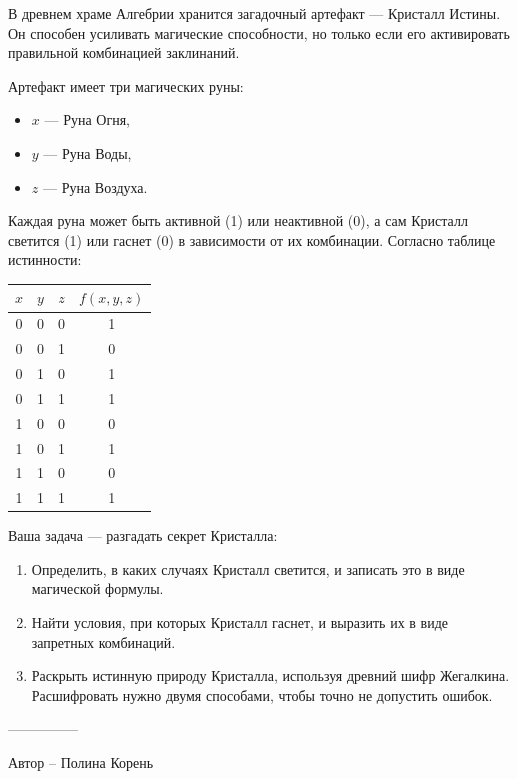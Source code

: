 \question
В древнем храме Алгебрии хранится загадочный артефакт — Кристалл Истины. Он способен усиливать магические способности, но только если его активировать правильной комбинацией заклинаний.

Артефакт имеет три магических руны:
\begin{itemize}
    \item \(x\) — Руна Огня,
    \item \(y\) — Руна Воды,
    \item \(z\) — Руна Воздуха.
\end{itemize}

Каждая руна может быть активной (1) или неактивной (0), а сам Кристалл светится (1) или гаснет (0) в зависимости от их комбинации. Согласно таблице истинности:

\begin{center}
\begin{tabular}{|c|c|c|c|}
\hline
\(x\) & \(y\) & \(z\) & \(f(x, y, z)\) \\
\hline
0 & 0 & 0 & 1 \\
0 & 0 & 1 & 0 \\
0 & 1 & 0 & 1 \\
0 & 1 & 1 & 1 \\
1 & 0 & 0 & 0 \\
1 & 0 & 1 & 1 \\
1 & 1 & 0 & 0 \\
1 & 1 & 1 & 1 \\
\hline
\end{tabular}
\end{center}

Ваша задача — разгадать секрет Кристалла:

\begin{enumerate}
  \item Определить, в каких случаях Кристалл светится, и записать это в виде магической формулы.
  \item Найти условия, при которых Кристалл гаснет, и выразить их в виде запретных комбинаций.
  \item Раскрыть истинную природу Кристалла, используя древний шифр Жегалкина. Расшифровать нужно двумя способами, чтобы точно не допустить ошибок.
  \end{enumerate}

  ---------------

Автор -- Полина Корень